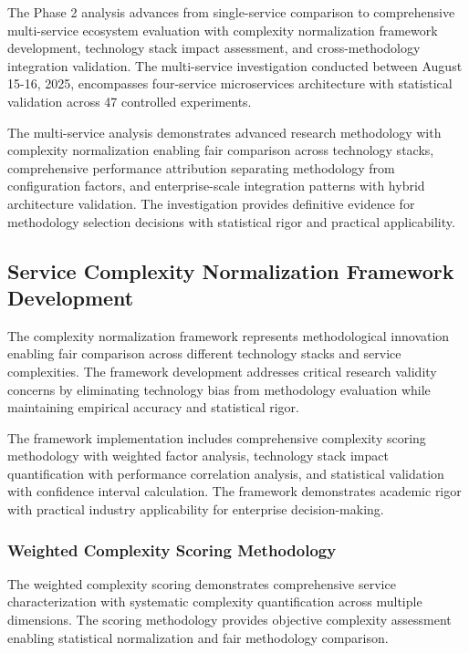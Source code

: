The Phase 2 analysis advances from single-service comparison to comprehensive multi-service ecosystem evaluation with complexity normalization framework development, technology stack impact assessment, and cross-methodology integration validation. The multi-service investigation conducted between August 15-16, 2025, encompasses four-service microservices architecture with statistical validation across 47 controlled experiments.

The multi-service analysis demonstrates advanced research methodology with complexity normalization enabling fair comparison across technology stacks, comprehensive performance attribution separating methodology from configuration factors, and enterprise-scale integration patterns with hybrid architecture validation. The investigation provides definitive evidence for methodology selection decisions with statistical rigor and practical applicability.

\subsection{Service Complexity Normalization Framework Development}
\label{subsec:complexity_framework}

The complexity normalization framework represents methodological innovation enabling fair comparison across different technology stacks and service complexities. The framework development addresses critical research validity concerns by eliminating technology bias from methodology evaluation while maintaining empirical accuracy and statistical rigor.

The framework implementation includes comprehensive complexity scoring methodology with weighted factor analysis, technology stack impact quantification with performance correlation analysis, and statistical validation with confidence interval calculation. The framework demonstrates academic rigor with practical industry applicability for enterprise decision-making.

\subsubsection{Weighted Complexity Scoring Methodology}

The weighted complexity scoring demonstrates comprehensive service characterization with systematic complexity quantification across multiple dimensions. The scoring methodology provides objective complexity assessment enabling statistical normalization and fair methodology comparison.

